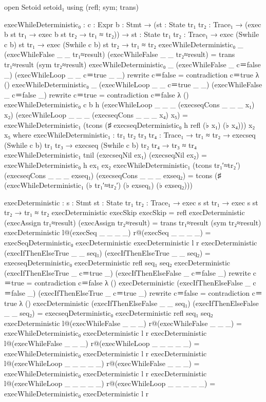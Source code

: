     open Setoid setoid₁ using (refl; sym; trans)
            
    execWhileDeterministic₀ : {c : Expr} {b : Stmt} → ({st : State} {tr₁ tr₂ : Trace₁} → (exec b st tr₁ → exec b st tr₂ → tr₁ ≈ tr₂))
        → {st : State} {tr₁ tr₂ : Trace₁} → exec (Swhile c b) st tr₁ → exec (Swhile c b) st tr₂ → tr₁ ≈ tr₂
    execWhileDeterministic₀ _ (execWhileFalse _ _ tr₁≈result) (execWhileFalse _ _ tr₂≈result)                 = trans tr₁≈result (sym tr₂≈result)
    execWhileDeterministic₀ _ (execWhileFalse _ c＝false _)   (execWhileLoop _ _ c＝true _ _) rewrite c＝false = contradiction c＝true λ ()
    execWhileDeterministic₀ _ (execWhileLoop _ _ c＝true _ _) (execWhileFalse _ c＝false _)   rewrite c＝true  = contradiction c＝false λ ()
    execWhileDeterministic₀ {c} {b} h (execWhileLoop _ _ _ (execseqCons _ _ _ x₁) x₂) (execWhileLoop _ _ _ (execseqCons _ _ _ x₄) x₅) = execWhileDeterministic₁ (tcons (♯ execseqDeterministic₀ h refl (♭ x₁) (♭ x₄))) x₂ x₅
        where
            execWhileDeterministic₁ : {tr₁ tr₂ tr₃ tr₄ : Trace₁} → tr₁ ≈ tr₂ → execseq (Swhile c b) tr₁ tr₃ → execseq (Swhile c b) tr₂ tr₄ → tr₃ ≈ tr₄
            execWhileDeterministic₁ tnil              (execseqNil ex₁)       (execseqNil ex₂)       = execWhileDeterministic₀ h ex₁ ex₂
            execWhileDeterministic₁ (tcons tr₁′≈tr₂′) (execseqCons _ _ _ exseq₁) (execseqCons _ _ _ exseq₂) = tcons (♯ (execWhileDeterministic₁ (♭ tr₁′≈tr₂′) (♭ exseq₁) (♭ exseq₂)))

    
    execDeterministic : {s : Stmt} {st : State} {tr₁ tr₂ : Trace₁} 
        → exec s st tr₁ 
        → exec s st tr₂ 
        → tr₁ ≈ tr₂
    execDeterministic execSkip                           execSkip                                           = refl
    execDeterministic (execAssign tr₁≈result)            (execAssign tr₂≈result)                            = trans tr₁≈result (sym tr₂≈result)
    execDeterministic l@(execSeq _ _ _ _)                r@(execSeq _ _ _ _)                                = execSeqDeterministic₀ execDeterministic execDeterministic l r
    execDeterministic (execIfThenElseTrue _ _ seq₁)      (execIfThenElseTrue _ _ seq₂)                      = execseqDeterministic₀ execDeterministic refl seq₁ seq₂
    execDeterministic (execIfThenElseTrue _ c＝true _)   (execIfThenElseFalse _ c＝false _) rewrite c＝true  = contradiction c＝false λ ()
    execDeterministic (execIfThenElseFalse _ c＝false _) (execIfThenElseTrue _ c＝true _)   rewrite c＝false = contradiction c＝true λ ()
    execDeterministic (execIfThenElseFalse _ _ seq₁)     (execIfThenElseFalse _ _ seq₂)                     = execseqDeterministic₀ execDeterministic refl seq₁ seq₂
    execDeterministic l@(execWhileFalse _ _ _)           r@(execWhileFalse _ _ _)                           = execWhileDeterministic₀ execDeterministic l r
    execDeterministic l@(execWhileFalse _ _ _)           r@(execWhileLoop _ _ _ _ _)                        = execWhileDeterministic₀ execDeterministic l r
    execDeterministic l@(execWhileLoop _ _ _ _ _)        r@(execWhileFalse _ _ _)                           = execWhileDeterministic₀ execDeterministic l r
    execDeterministic l@(execWhileLoop _ _ _ _ _)        r@(execWhileLoop _ _ _ _ _)                        = execWhileDeterministic₀ execDeterministic l r 